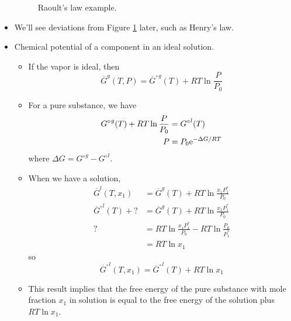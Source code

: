 \documentclass[../notes.tex]{subfiles}
\begin{document}
\begin{itemize}
\begin{figure}[h!]
        \caption{Raoult's law example.}
        \label{fig:RaoultsLaw}
    \end{figure}
    \item We'll see deviations from Figure \ref{fig:RaoultsLaw} later, such as Henry's law.
    \item Chemical potential of a component in an ideal solution.
    \begin{itemize}
        \item If the vapor is ideal, then
        \begin{equation*}
            \overline{G}^g(T,P) = {\overline{G}^\circ}^g(T)+RT\ln\frac{P}{P_0}
        \end{equation*}
        \item For a pure substance, we have
        \begin{align*}
            {G^\circ}^g(T)+RT\ln\frac{P}{P_0} &= {G^\circ}^l(T)\\
            P &= P_0\e[-\Delta G/RT]
        \end{align*}
        where $\Delta G={G^\circ}^g-{G^\circ}^l$.
        \item When we have a solution,
        \begin{align*}
            \overline{G}^l(T,x_1) &= \overline{G}^g(T)+RT\ln\frac{x_1P_1^*}{P_0}\\
            {\overline{G}^\circ}^l(T)+? &= \overline{G}^g(T)+RT\ln\frac{x_1P_1^*}{P_0}\\
            ? &= RT\ln\frac{x_1P_1^*}{P_0}-RT\ln\frac{P_0}{P_1^*}\\
            &= RT\ln x_1
        \end{align*}
        so
        \begin{equation*}
            {\overline{G}^\circ}^l(T,x_1) = {\overline{G}^\circ}^l(T)+RT\ln x_1
        \end{equation*}
        \item This result implies that the free energy of the pure substance with mole fraction $x_1$ in solution is equal to the free energy of the solution plus $RT\ln x_1$.

\end{itemize}
\end{itemize}
\end{document}
